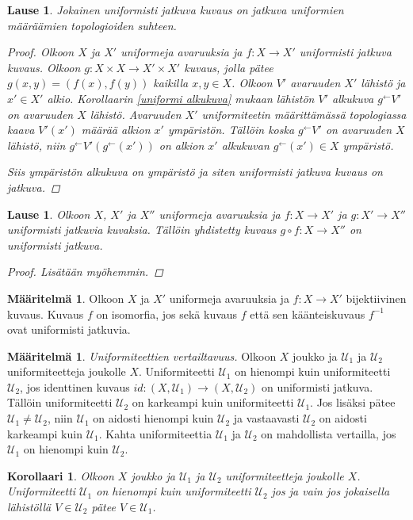 \documentclass[12pt,a4paper,leqno]{report}
\newcommand{\U}{\mathcal{U}}
\theoremstyle{plain}
\newtheorem{lause}[equation]{Lause}
\newtheorem{kor}[equation]{Korollaari}
\theoremstyle{definition}
\newtheorem{maar}[equation]{Määritelmä}
\theoremstyle{remark}
\begin{document}
\begin{lause}
Jokainen uniformisti jatkuva kuvaus on jatkuva uniformien määräämien topologioiden suhteen.
\begin{proof}
Olkoon $X$ ja $X'$ uniformeja avaruuksia 
ja $f\colon X\rightarrow X'$ uniformisti jatkuva kuvaus. 
Olkoon $g\colon X\times X\rightarrow X'\times X'$ %
kuvaus, jolla pätee $g(x,y)=(f(x),f(y))$ kaikilla $x,y\in X$. 
Olkoon $V'$ avaruuden $X'$ lähistö ja $x'\in X'$ alkio. 
Korollaarin \ref{uniformi alkukuva} mukaan lähistön $V'$ alkukuva $g^{\leftarrow}V'$ on avaruuden $X$ lähistö. 
Avaruuden $X'$ uniformiteetin määrittämässä topologiassa kaava $V'(x')$ määrää alkion $x'$ ympäristön.
Tällöin koska $g^{\leftarrow}V'$ on avaruuden $X$ lähistö, niin $g^{\leftarrow}V'(g^{\leftarrow}(x'))$ on alkion $x'$ alkukuvan $g^{\leftarrow}(x')\in X$ ympäristö. 

Siis ympäristön alkukuva on ympäristö ja siten uniformisti jatkuva kuvaus on jatkuva.
\end{proof}
\end{lause}
\begin{lause}
Olkoon $X$, $X'$ ja $X''$ uniformeja avaruuksia 
ja $f\colon X\rightarrow X'$ ja $g\colon X'\rightarrow X''$ uniformisti jatkuvia kuvaksia. Tällöin yhdistetty kuvaus $g\circ f\colon X\rightarrow X''$ on uniformisti jatkuva.
\begin{proof}
Lisätään myöhemmin.
\end{proof}
\end{lause}
\begin{maar}
Olkoon $X$ ja $X'$ uniformeja avaruuksia 
ja $f\colon X\rightarrow X'$ bijektiivinen kuvaus. Kuvaus $f$ on isomorfia, jos sekä kuvaus $f$ että sen käänteiskuvaus $f^{-1}$ ovat uniformisti jatkuvia.
\end{maar}
\begin{maar}
\emph{Uniformiteettien vertailtavuus.} 
Olkoon $X$ joukko ja $\U_1$ ja $\U_2$ uniformiteetteja joukolle $X$. 
Uniformiteetti $\U_1$ on hienompi kuin uniformiteetti $\U_2$, 
jos identtinen kuvaus $id\colon (X,\U_1)\rightarrow (X,\U_2)$ on uniformisti jatkuva. Tällöin uniformiteetti $\U_2$ on karkeampi kuin uniformiteetti $\U_1$. 
Jos lisäksi pätee $\U_1\neq\U_2$, niin $\U_1$ on aidosti hienompi kuin $\U_2$ ja vastaavasti $\U_2$ on aidosti karkeampi kuin $\U_1$. 
Kahta uniformiteettia $\U_1$ ja $\U_2$ on mahdollista vertailla, jos $\U_1$ on hienompi kuin $\U_2$.
\end{maar}
\begin{kor}
Olkoon $X$ joukko ja $\U_1$ ja $\U_2$ uniformiteetteja joukolle $X$. 
Uniformiteetti $\U_1$ on hienompi kuin uniformiteetti $\U_2$ jos ja vain jos jokaisella lähistöllä $V\in\U_2$ pätee $V\in\U_1$.
\end{kor}
\end{document}
